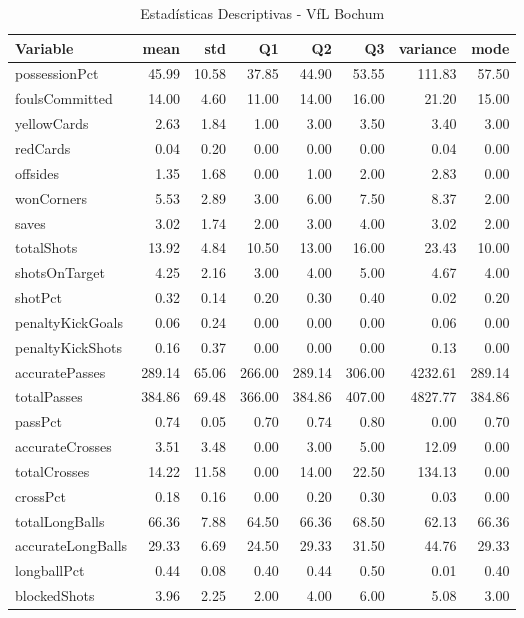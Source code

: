 \begin{table}[H]
\centering
\caption{Estadísticas Descriptivas - VfL Bochum}
\label{tab:ger_vfl_bochum}
\small
\begin{tabular}{lrrrrrrr}
\hline
Variable & mean & std & Q1 & Q2 & Q3 & variance & mode \\
\hline
possessionPct & 45.99 & 10.58 & 37.85 & 44.90 & 53.55 & 111.83 & 57.50 \\
foulsCommitted & 14.00 & 4.60 & 11.00 & 14.00 & 16.00 & 21.20 & 15.00 \\
yellowCards & 2.63 & 1.84 & 1.00 & 3.00 & 3.50 & 3.40 & 3.00 \\
redCards & 0.04 & 0.20 & 0.00 & 0.00 & 0.00 & 0.04 & 0.00 \\
offsides & 1.35 & 1.68 & 0.00 & 1.00 & 2.00 & 2.83 & 0.00 \\
wonCorners & 5.53 & 2.89 & 3.00 & 6.00 & 7.50 & 8.37 & 2.00 \\
saves & 3.02 & 1.74 & 2.00 & 3.00 & 4.00 & 3.02 & 2.00 \\
totalShots & 13.92 & 4.84 & 10.50 & 13.00 & 16.00 & 23.43 & 10.00 \\
shotsOnTarget & 4.25 & 2.16 & 3.00 & 4.00 & 5.00 & 4.67 & 4.00 \\
shotPct & 0.32 & 0.14 & 0.20 & 0.30 & 0.40 & 0.02 & 0.20 \\
penaltyKickGoals & 0.06 & 0.24 & 0.00 & 0.00 & 0.00 & 0.06 & 0.00 \\
penaltyKickShots & 0.16 & 0.37 & 0.00 & 0.00 & 0.00 & 0.13 & 0.00 \\
accuratePasses & 289.14 & 65.06 & 266.00 & 289.14 & 306.00 & 4232.61 & 289.14 \\
totalPasses & 384.86 & 69.48 & 366.00 & 384.86 & 407.00 & 4827.77 & 384.86 \\
passPct & 0.74 & 0.05 & 0.70 & 0.74 & 0.80 & 0.00 & 0.70 \\
accurateCrosses & 3.51 & 3.48 & 0.00 & 3.00 & 5.00 & 12.09 & 0.00 \\
totalCrosses & 14.22 & 11.58 & 0.00 & 14.00 & 22.50 & 134.13 & 0.00 \\
crossPct & 0.18 & 0.16 & 0.00 & 0.20 & 0.30 & 0.03 & 0.00 \\
totalLongBalls & 66.36 & 7.88 & 64.50 & 66.36 & 68.50 & 62.13 & 66.36 \\
accurateLongBalls & 29.33 & 6.69 & 24.50 & 29.33 & 31.50 & 44.76 & 29.33 \\
longballPct & 0.44 & 0.08 & 0.40 & 0.44 & 0.50 & 0.01 & 0.40 \\
blockedShots & 3.96 & 2.25 & 2.00 & 4.00 & 6.00 & 5.08 & 3.00 \\

\end{tabular}
\end{table}
